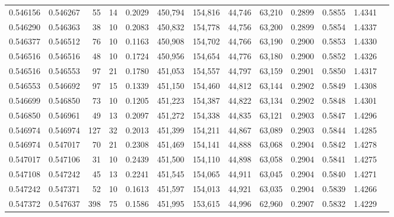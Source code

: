 \begin{tabular}{rrrrrrrrrrrrr}
0.546156 & 0.546267 &    55 &  14 &                                     0.2029 & 450,794 & 154,816 &  44,746 &  63,210 & 0.2899 & 0.5855 & 1.4341 \\
0.546290 & 0.546363 &    38 &  10 &                                     0.2083 & 450,832 & 154,778 &  44,756 &  63,200 & 0.2899 & 0.5854 & 1.4337 \\
0.546377 & 0.546512 &    76 &  10 &                                     0.1163 & 450,908 & 154,702 &  44,766 &  63,190 & 0.2900 & 0.5853 & 1.4330 \\
0.546516 & 0.546516 &    48 &  10 &                                     0.1724 & 450,956 & 154,654 &  44,776 &  63,180 & 0.2900 & 0.5852 & 1.4326 \\
0.546516 & 0.546553 &    97 &  21 &                                     0.1780 & 451,053 & 154,557 &  44,797 &  63,159 & 0.2901 & 0.5850 & 1.4317 \\
0.546553 & 0.546692 &    97 &  15 &                                     0.1339 & 451,150 & 154,460 &  44,812 &  63,144 & 0.2902 & 0.5849 & 1.4308 \\
0.546699 & 0.546850 &    73 &  10 &                                     0.1205 & 451,223 & 154,387 &  44,822 &  63,134 & 0.2902 & 0.5848 & 1.4301 \\
0.546850 & 0.546961 &    49 &  13 &                                     0.2097 & 451,272 & 154,338 &  44,835 &  63,121 & 0.2903 & 0.5847 & 1.4296 \\
0.546974 & 0.546974 &   127 &  32 &                                     0.2013 & 451,399 & 154,211 &  44,867 &  63,089 & 0.2903 & 0.5844 & 1.4285 \\
0.546974 & 0.547017 &    70 &  21 &                                     0.2308 & 451,469 & 154,141 &  44,888 &  63,068 & 0.2904 & 0.5842 & 1.4278 \\
0.547017 & 0.547106 &    31 &  10 &                                     0.2439 & 451,500 & 154,110 &  44,898 &  63,058 & 0.2904 & 0.5841 & 1.4275 \\
0.547108 & 0.547242 &    45 &  13 &                                     0.2241 & 451,545 & 154,065 &  44,911 &  63,045 & 0.2904 & 0.5840 & 1.4271 \\
0.547242 & 0.547371 &    52 &  10 &                                     0.1613 & 451,597 & 154,013 &  44,921 &  63,035 & 0.2904 & 0.5839 & 1.4266 \\
0.547372 & 0.547637 &   398 &  75 &                                     0.1586 & 451,995 & 153,615 &  44,996 &  62,960 & 0.2907 & 0.5832 & 1.4229 \\

\end{tabular}
